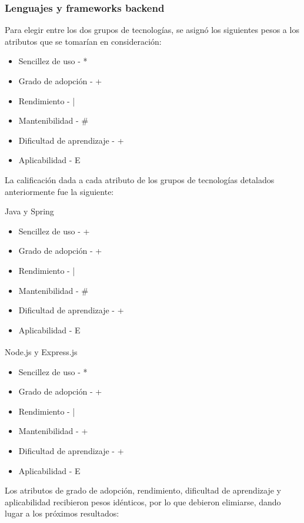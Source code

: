 \documentclass{article}
\begin{document}
\subsubsection{Lenguajes y frameworks backend}
Para elegir entre los dos grupos de tecnologías, se asignó los siguientes pesos a los atributos que se tomarían en consideración:
\begin{itemize}
    \item Sencillez de uso - *
    \item Grado de adopción - +
    \item Rendimiento - |
    \item Mantenibilidad - \#
    \item Dificultad de aprendizaje - +
    \item Aplicabilidad - E
\end{itemize}
La calificación dada a cada atributo de los grupos de tecnologías detalados anteriormente fue la siguiente:

Java y Spring
\begin{itemize}
    \item Sencillez de uso - +
    \item Grado de adopción - +
    \item Rendimiento - |
    \item Mantenibilidad - \#
    \item Dificultad de aprendizaje - +
    \item Aplicabilidad - E
\end{itemize}
Node.js\textsuperscript{\textregistered} y Express.js
\begin{itemize}
    \item Sencillez de uso - *
    \item Grado de adopción - +
    \item Rendimiento - |
    \item Mantenibilidad - +
    \item Dificultad de aprendizaje - +
    \item Aplicabilidad - E
\end{itemize}
Los atributos de grado de adopción, rendimiento, dificultad de aprendizaje y aplicabilidad recibieron pesos idénticos, por lo que debieron elimiarse, dando lugar a los próximos resultados:
\end{document}
